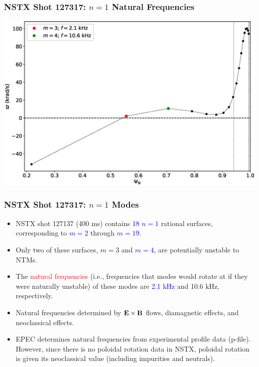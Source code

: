 \documentclass{beamer}
\newcommand{\blue}[1]{\textcolor{blue}{#1}}
\newcommand{\red}[1]{\textcolor{red}{#1}}
\begin{document}
\begin{frame}
\frametitle{NSTX Shot 127317: $n=1$ Natural Frequencies}

\begin{center}
\includegraphics[width=\textwidth]{Frequency.eps}
\end{center}
\end{frame}

\begin{frame}
\frametitle{NSTX Shot 127317: $n=1$ Modes}
\begin{itemize}
\item NSTX shot 127137 (400 ms) contains \blue{18 $n=1$} rational surfaces, corresponding to \blue{$m=2$} through
\blue{$m=19$}. 
\item Only two of these surfaces, {$m=3$} and \blue{$m=4$}, are potentially unstable to NTMs.  
\item The \red{natural frequencies} (i.e., frequencies that modes would rotate at if they were naturally unstable) of
these modes are \blue{2.1 kHz} and 10.6 kHz, respectively. 
\item Natural frequencies determined by \blue{${\bf E}\times {\bf B}$} flows, diamagnetic effects, and neoclassical
effects. 
\item EPEC determines natural frequencies from experimental profile data (p-file). However, since there is no
poloidal rotation data in NSTX, poloidal rotation is given its neoclassical value (including impurities and neutrals). 
\end{itemize}
\end{frame}
\end{document}

